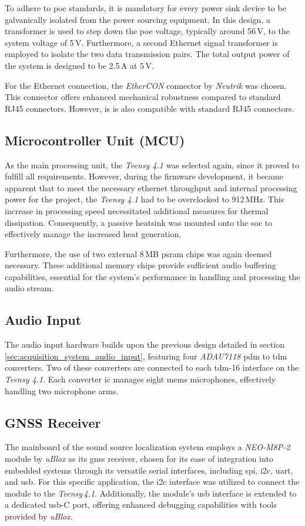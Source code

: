 To adhere to \acrshort{poe} standards, it is mandatory for every power sink device to be galvanically isolated from the power sourcing equipment.
In this design, a transformer is used to step down the \acrshort{poe} voltage, typically around 56\,V, to the system voltage of 5\,V.
Furthermore, a second Ethernet signal transformer is employed to isolate the two data transmission pairs.
The total output power of the system is designed to be 2.5\,A at 5\,V.

For the Ethernet connection, the \textit{EtherCON} connector by \textit{Neutrik} was chosen.
This connector offers enhanced mechanical robustness compared to standard RJ45 connectors.
However, is is also compatible with standard RJ45 connectors.

\newpage
\subsection{Microcontroller Unit (MCU)}
As the main processing unit, the \textit{Teensy 4.1} was selected again, since it proved to fulfill all requirements.
However, during the firmware development, it became apparent that to meet the necessary ethernet throughput and internal processing power for the project,
the \textit{Teensy 4.1} had to be overclocked to 912\,MHz.
This increase in processing speed necessitated additional measures for thermal dissipation.
Consequently, a passive heatsink was mounted onto the \acrshort{soc} to effectively manage the increased heat generation.

Furthermore, the use of two external 8\,MB \acrshort{psram} chips was again deemed necessary.
These additional memory chips provide sufficient audio buffering capabilities,
essential for the system's performance in handling and processing the audio stream.

\subsection{Audio Input}
The audio input hardware builds upon the previous design detailed in section \ref{sec:acquisition_system_audio_input}, featuring four \textit{ADAU7118} \acrshort{pdm} to \acrshort{tdm} converters.
Two of these converters are connected to each \acrshort{tdm}-16 interface on the \textit{Teensy 4.1}.
Each converter \acrshort{ic} manages eight \acrshort{mems} microphones, effectively handling two microphone arms.

\subsection{GNSS Receiver}
The mainboard of the sound source localization system employs a \textit{NEO-M8P-2} module by \textit{uBlox} as its \acrshort{gnss} receiver,
chosen for its ease of integration into embedded systems through its versatile serial interfaces, including \acrshort{spi}, \acrshort{i2c}, \acrshort{uart}, and \acrshort{usb}.
For this specific application, the \acrshort{i2c} interface was utilized to connect the module to the \textit{Teensy\,4.1}.
Additionally, the module's \acrshort{usb} interface is extended to a dedicated \acrshort{usb}-C port, offering enhanced debugging capabilities with tools provided by \textit{uBlox}.

